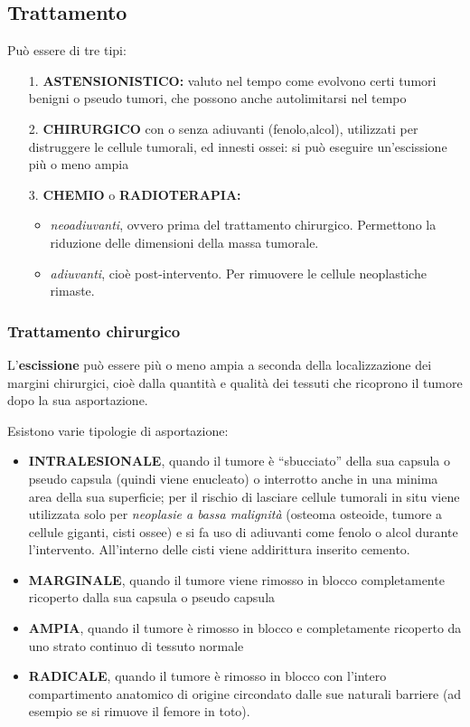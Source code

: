 \subsection{Trattamento}

Può essere di tre tipi:

\begin{itemize}
\item[1.]
  \textbf{ASTENSIONISTICO:} valuto nel tempo come evolvono certi tumori benigni o pseudo tumori, che possono anche autolimitarsi nel tempo
\item[2.]
  \textbf{CHIRURGICO} con o senza adiuvanti (fenolo,alcol), utilizzati per distruggere le cellule tumorali, ed innesti ossei: si può eseguire un'escissione più o meno ampia
\item[3.]
  \textbf{CHEMIO} o \textbf{RADIOTERAPIA:}
\begin{itemize}
\item
  \emph{neoadiuvanti}, ovvero prima del trattamento chirurgico. Permettono la riduzione delle dimensioni della massa tumorale.
\item
  \emph{adiuvanti}, cioè post-intervento. Per rimuovere le cellule neoplastiche rimaste.
\end{itemize}
\end{itemize}

\subsubsection{Trattamento chirurgico}

L'\textbf{escissione} può essere più o meno ampia a seconda della localizzazione dei margini chirurgici, cioè dalla quantità e qualità dei tessuti che ricoprono il tumore dopo la sua asportazione.

Esistono varie tipologie di asportazione:

\begin{itemize}
\item
  \textbf{INTRALESIONALE}, quando il tumore è ``sbucciato'' della sua capsula o pseudo capsula (quindi viene enucleato) o interrotto anche in una minima area della sua superficie; per il rischio di lasciare cellule tumorali in situ viene utilizzata solo per \emph{neoplasie a bassa malignità} (osteoma osteoide, tumore a cellule giganti, cisti ossee) e si fa uso di adiuvanti come fenolo o alcol durante l'intervento.
All'interno delle cisti viene addirittura inserito cemento.
\item
  \textbf{MARGINALE}, quando il tumore viene rimosso in blocco completamente ricoperto dalla sua capsula o pseudo capsula
\item
  \textbf{AMPIA}, quando il tumore è rimosso in blocco e completamente ricoperto da uno strato continuo di tessuto normale
\item
  \textbf{RADICALE}, quando il tumore è rimosso in blocco con l'intero compartimento anatomico di origine circondato dalle sue naturali barriere (ad esempio se si rimuove il femore in toto).
\end{itemize}

